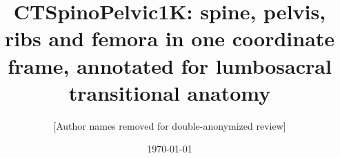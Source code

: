 \documentclass[aapm,mph,amsmath,amssymb,reprint]{revtex4-2}
\newif\ifreview \reviewtrue
\begin{document}
\setlength{\dbltextfloatsep}{10pt plus 2pt minus 2pt}
\setlength{\textfloatsep}{10pt plus 2pt minus 2pt}

\title{CTSpinoPelvic1K: spine, pelvis, ribs and femora in one coordinate frame,
       annotated for lumbosacral transitional anatomy}

\ifreview
\author{[Author names removed for double-anonymized review]}
\else
\author{Gregory Schwing}\email{gregory.schwing@med.wayne.edu}
\affiliation{Department of Surgery, Detroit Medical Center and Wayne State University, Detroit, Michigan, USA}
\author{Ashley Schehr}
\author{Annika Tekumulla}
\author{Margret Khoushi}
\author{Ryan Christian}
\author{Dane Hubers}
\author{Faris Mahjoub}
\author{Hassan Saad}
\author{Mia Sooch}
\author{Sathyagopal Siddapureddy}
\author{Michael McLellan}
\author{Jerick Kim}
\affiliation{School of Medicine, Wayne State University, Detroit, Michigan, USA}
\author{Miraziz Ismoilov}
\author{Nizar Alnabahneh}
\affiliation{Department of Radiology, Detroit Medical Center and Wayne State University, Detroit, Michigan, USA}
\fi

\date{\today}
\end{document}
